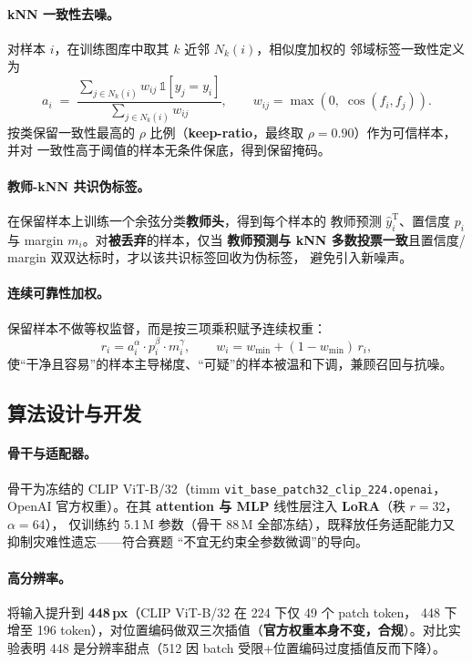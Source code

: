 \documentclass[11pt]{ctexart}
\newcommand{\kw}[1]{\textbf{#1}}
\begin{document}
\paragraph{kNN 一致性去噪。}对样本 $i$，在训练图库中取其 $k$ 近邻 $N_k(i)$，相似度加权的
邻域标签一致性定义为
\begin{equation}
a_i \;=\; \frac{\sum_{j\in N_k(i)} w_{ij}\,\mathbb{1}[y_j=y_i]}{\sum_{j\in N_k(i)} w_{ij}},
\qquad w_{ij}=\max(0,\;\cos(f_i,f_j)).
\end{equation}
按类保留一致性最高的 $\rho$ 比例（\kw{keep-ratio}，最终取 $\rho=0.90$）作为可信样本，并对
一致性高于阈值的样本无条件保底，得到保留掩码。

\paragraph{教师-kNN 共识伪标签。}在保留样本上训练一个余弦分类\kw{教师头}，得到每个样本的
教师预测 $\hat y^{\text{T}}_i$、置信度 $p_i$ 与 margin $m_i$。对\kw{被丢弃}的样本，仅当
\kw{教师预测与 kNN 多数投票一致}且置信度/ margin 双双达标时，才以该共识标签回收为伪标签，
避免引入新噪声。

\paragraph{连续可靠性加权。}保留样本不做等权监督，而是按三项乘积赋予连续权重：
\begin{equation}
r_i = a_i^{\alpha}\cdot p_i^{\beta}\cdot m_i^{\gamma},
\qquad
w_i = w_{\min} + (1-w_{\min})\,r_i,
\end{equation}
使“干净且容易”的样本主导梯度、“可疑”的样本被温和下调，兼顾召回与抗噪。

\subsection{算法设计与开发}
\paragraph{骨干与适配器。}骨干为冻结的 CLIP ViT-B/32（timm \texttt{vit\_base\_patch32\_clip\_224.openai}，
OpenAI 官方权重）。在其 \kw{attention 与 MLP} 线性层注入 \kw{LoRA}（秩 $r=32$，$\alpha=64$），
仅训练约 5.1\,M 参数（骨干 88\,M 全部冻结），既释放任务适配能力又抑制灾难性遗忘——符合赛题
“不宜无约束全参数微调”的导向。

\paragraph{高分辨率。}将输入提升到 \kw{448\,px}（CLIP ViT-B/32 在 224 下仅 49 个 patch token，
448 下增至 196 token），对位置编码做双三次插值（\kw{官方权重本身不变，合规}）。对比实验表明
448 是分辨率甜点（512 因 batch 受限+位置编码过度插值反而下降）。
\end{document}
